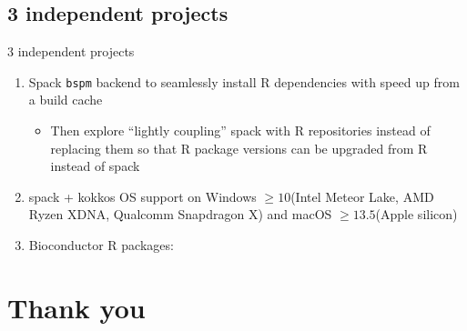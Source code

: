 \documentclass[
aspectratio=169,
xcolor={usenames}
]{beamer}
\begin{document}
\subsection{3 independent projects}
\begin{frame}{3 independent projects}
  \begin{enumerate}[<+->]
  \item Spack \texttt{bspm} backend to seamlessly install R dependencies %
    with speed up from a build cache
    \begin{itemize}
    \item Then explore ``lightly coupling'' spack with R repositories %
      instead of replacing them %
      so that R package versions can be upgraded from R instead of spack
    \end{itemize}
  \item spack + kokkos OS support on %
    Windows $\ge 10$\footnotemark[1]
    (Intel Meteor Lake, AMD Ryzen XDNA, Qualcomm Snapdragon X) and %
    macOS $\ge 13.5$\footnotemark[2]
    (Apple silicon)
  \item Bioconductor R packages\footnotemark[3]:
  \end{enumerate}
\end{frame}

\section{Thank you}
\end{document}

